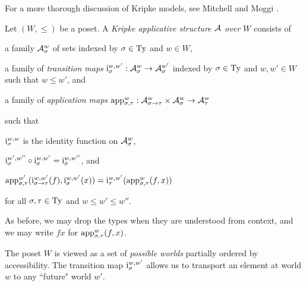 For a more thorough discussion of Kripke models, see Mitchell and Moggi \cite{DBLP:journals/apal/MitchellM91}.

\begin{defn}
Let $(W, \le)$ be a poset. A \emph{Kripke applicative structure $\mathcal{A}$ over $W$} consists of
\begin{items}
    \item a family $\mathcal{A}_{\sigma}^{w}$ of sets indexed by $\sigma \in \mathrm{Ty}$ and $w \in W$,
    \item a family of \emph{transition maps} $\kstran[\sigma][w,w'] : \kscomp{\struct{A}}{\sigma}{w} \to \kscomp{\struct{A}}{\sigma}{w'}$ indexed by $\sigma \in \mathrm{Ty}$ and $w, w' \in W$ such that $w \le w'$, and
    \item a family of \emph{application maps} $\ksapp[\sigma,\tau][w] : \cartprod{\kscomp{\struct{A}}{\functy{\sigma}{\tau}}{w}}{\kscomp{\struct{A}}{\sigma}{w}} \to \kscomp{\struct{A}}{\tau}{w}$
\end{items}
such that
\begin{items}
    \item $\kstran[\sigma][w,w]$ is the identity function on $\mathcal{A}_{\sigma}^{w}$,
    \item $\kstran[\sigma][w',w''] \circ \kstran[\sigma][w,w'] = \kstran[\sigma][w,w'']$, and
    \item $\ksapp[\sigma,\tau][w'](\kstran[\functy{\sigma}{\tau}][w,w'](f), \kstran[\sigma][w,w'](x)) = \kstran[\tau][w,w'](\ksapp[\sigma,\tau][w](f, x))$
\end{items}
for all $\sigma, \tau \in \mathrm{Ty}$ and $w \le w' \le w''$.
\end{defn}

\begin{notn}
As before, we may drop the types when they are understood from context, and we may write $fx$ for $\ksapp[\sigma,\tau][w](f, x)$.
\end{notn}

The poset $W$ is viewed as a set of \textit{possible worlds} partially ordered by accessibility. The transition map $\kstran[\sigma][w,w']$ allows us to transport an element at world $w$ to any ``future" world $w'$.




